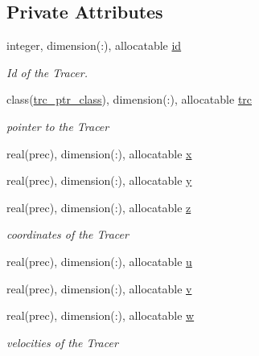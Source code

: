 \subsection*{Private Attributes}
\begin{DoxyCompactItemize}
\item 
integer, dimension(\+:), allocatable \mbox{\hyperlink{structaot__mod_1_1aot__class_ad4bc41c8c0f5dc4ade794eae2d2d5cd5}{id}}
\begin{DoxyCompactList}\small\item\em Id of the Tracer. \end{DoxyCompactList}\item 
class(\mbox{\hyperlink{structaot__mod_1_1trc__ptr__class}{trc\+\_\+ptr\+\_\+class}}), dimension(\+:), allocatable \mbox{\hyperlink{structaot__mod_1_1aot__class_a9f05f9f23b3850d0e79a62d139a633c2}{trc}}
\begin{DoxyCompactList}\small\item\em pointer to the Tracer \end{DoxyCompactList}\item 
real(prec), dimension(\+:), allocatable \mbox{\hyperlink{structaot__mod_1_1aot__class_a4a72558d7ea656f16aca0126e6925725}{x}}
\item 
real(prec), dimension(\+:), allocatable \mbox{\hyperlink{structaot__mod_1_1aot__class_a72bd4c6e0f45ae10286a4a179bda49f0}{y}}
\item 
real(prec), dimension(\+:), allocatable \mbox{\hyperlink{structaot__mod_1_1aot__class_a93f7b7406cbec91c69fdac5bc3505522}{z}}
\begin{DoxyCompactList}\small\item\em coordinates of the Tracer \end{DoxyCompactList}\item 
real(prec), dimension(\+:), allocatable \mbox{\hyperlink{structaot__mod_1_1aot__class_a3aab3baa9fb76719b7d2179d0be7879c}{u}}
\item 
real(prec), dimension(\+:), allocatable \mbox{\hyperlink{structaot__mod_1_1aot__class_a5ff46826ac545ade3a41d66c174870f8}{v}}
\item 
real(prec), dimension(\+:), allocatable \mbox{\hyperlink{structaot__mod_1_1aot__class_a6ec825475ad78b546b7067afec0d043f}{w}}
\begin{DoxyCompactList}\small\item\em velocities of the Tracer \end{DoxyCompactList}\end{DoxyCompactItemize}


